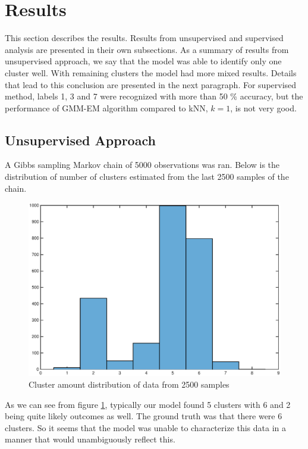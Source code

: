 \documentclass[a4paper]{article}
\begin{document}
\section{Results}

This section describes the results. Results from unsupervised and supervised analysis are presented in their own subsections. As a summary of results from unsupervised approach, we say that the model was able to identify only one cluster well. With remaining clusters the model had more mixed results. Details that lead to this conclusion are presented in the next paragraph. For supervised method, labels 1, 3 and 7 were recognized with more than 50 \% accuracy, but the performance of GMM-EM algorithm compared to kNN, $ k = 1 $, is not very good.

\subsection{Unsupervised Approach}

\par
A Gibbs sampling Markov chain of 5000 observations was ran. Below is the distribution of number of clusters estimated from the last 2500 samples of the chain.

\begin{figure}[H]
	\includegraphics[trim={2cm 1cm 2cm 1cm},clip,scale=0.56]{k_dist_5000.eps}
	\caption{Cluster amount distribution of data from 2500 samples}
	\label{k_dist}
\end{figure}

As we can see from figure \ref{k_dist}, typically our model found 5 clusters with 6 and 2 being quite likely outcomes as well. The ground truth was that there were 6 clusters. So it seems that the model was unable to characterize this data in a manner that would  unambiguously reflect this.
\end{document}
